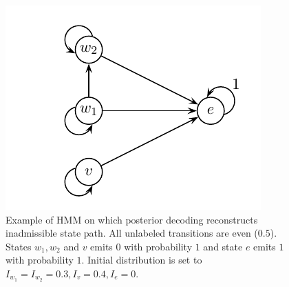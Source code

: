 \begin{figure}
\begin{center}
\includegraphics{../figures/posteriorInadmissibleStatePath.pdf}
\end{center}
\caption[Hidden Markov Model on which posterior decoding reconstructs
inadmissible state path]{
Example of HMM on which posterior decoding reconstructs inadmissible state path. 
All unlabeled transitions are even ($0.5$). States $w_1,w_2$ and $v$ emits $0$
with probability $1$ and state $e$ emits $1$ with probability $1$.
Initial distribution is set to $I_{w_1}=I_{w_2}=0.3, I_{v}=0.4, I_{e}=0$.
}\label{FIGURE:INADMISSIBLESTATEPATH}
\end{figure}


